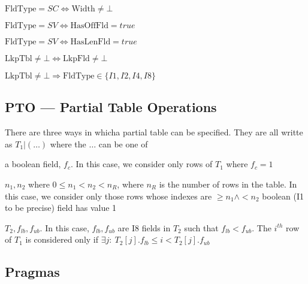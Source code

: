 \begin{invariant}
\(\mathrm{FldType} = SC \Leftrightarrow \mathrm{Width} \neq \bot \)
\end{invariant}

\begin{invariant}
\(\mathrm{FldType} = SV \Leftrightarrow \mathrm{HasOffFld} = true\)
\end{invariant}

\begin{invariant}
\(\mathrm{FldType} = SV \Leftrightarrow \mathrm{HasLenFld} = true\)
\end{invariant}

\begin{invariant}
\(\mathrm{LkpTbl} \neq \bot \Leftrightarrow \mathrm{LkpFld} \neq \bot\)
\end{invariant}

\begin{invariant}
\(\mathrm{LkpTbl} \neq \bot \Rightarrow \mathrm{FldType} \in \{I1, I2, I4, I8\}\)
\end{invariant}

\subsection{PTO --- Partial Table Operations}
\label{PTO}
There are three ways in whicha  partial table can be specified. They are all
writte as \(T_1|(\ldots)\) where the \(\ldots\) can be one of 
\be
\item a boolean field, \(f_c\).
In this case, we consider only rows of \(T_1\) where \(f_c = 1\)
\item \(n_1, n_2\) where \( 0 \leq n_1 < n_2 < n_R\), where \(n_R\) is the number
of rows in the table. 
In this case, we consider only those rows whose indexes
are \(\geq n_1 \wedge < n_2\)
boolean (I1 to be precise) field has value 1 
\item \(T_2, f_{lb}, f_{ub}\). In this case, \(f_{lb}, f_{ub}\) are I8 fields in
\(T_2\) such that \(f_{lb} < f_{ub}\). The \(i^{th}\) row of 
\(T_1\)  is considered only if \(\exists j:~ T_2[j].f_{lb} \leq i <
T_2[j].f_{ub}\)

\ee

\subsection{Pragmas}

